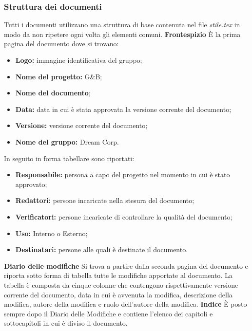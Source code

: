 		\subsubsection{Struttura dei documenti}
			Tutti i documenti utilizzano una struttura di base contenuta nel file \textit{stile.tex} in modo da non ripetere ogni volta gli elementi comuni.
			\newline \newline \textbf{Frontespizio} È la prima pagina del documento dove si trovano:
			\begin{itemize}
				\item \textbf{Logo:} immagine identificativa del gruppo;
				\item \textbf{Nome del progetto:} G\&B;
				\item \textbf{Nome del documento};
				\item \textbf{Data:} data in cui è stata approvata la versione corrente del documento;
				\item \textbf{Versione:} versione corrente del documento;
				\item \textbf{Nome del gruppo:} Dream Corp.
			\end{itemize}
			In seguito in forma tabellare sono riportati:
			\begin{itemize}
				\item \textbf{Responsabile:} persona a capo del progetto nel momento in cui è stato approvato;
				\item \textbf{Redattori:} persone incaricate nella stesura del documento;
				\item \textbf{Verificatori:} persone incaricate di controllare la qualità del documento;
				\item \textbf{Uso:} Interno o Esterno;
				\item \textbf{Destinatari:} persone alle quali è destinate il documento.
			\end{itemize}
		\textbf{Diario delle modifiche}  Si trova a partire dalla seconda pagina del documento e riporta sotto forma di tabella tutte le modifiche apportate al documento. La tabella è composta da cinque colonne che contengono rispettivamente versione corrente del documento, data in cui è avvenuta la modifica, descrizione della modifica, autore della modifica e ruolo dell'autore della modifica.
		\newline \newline \textbf{Indice}  È posto sempre dopo il Diario delle Modifiche e contiene l'elenco dei capitoli e sottocapitoli in cui è diviso il documento.
